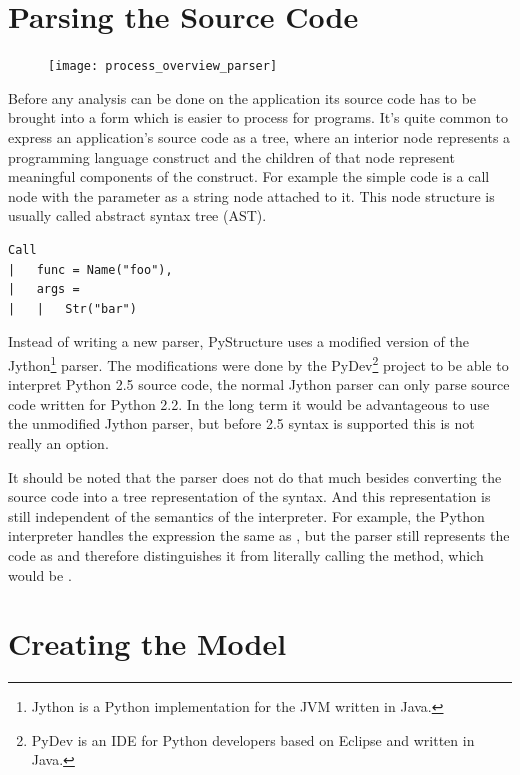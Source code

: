 \documentclass[12pt,halfparskip,DIV11,BCOR10mm]{scrreprt}
\begin{document}
\section{Parsing the Source Code}

\begin{figure}
	\vspace{-0.6cm}
	\texttt{[image: process\_overview\_parser]}
\end{figure}

Before any analysis can be done on the application its source code has to be brought into a form which is easier to process for programs. It's quite common to express an application's source code as a tree, where an interior node represents a programming language construct and the children of that node represent meaningful components of the construct. For example the simple code  is a call node with the parameter as a string node attached to it. This node structure is usually called abstract syntax tree (AST).

\begin{lstlisting}
Call
|   func = Name("foo"),
|   args = 
|   |   Str("bar")
\end{lstlisting}

Instead of writing a new parser, PyStructure uses a modified version of the Jython\footnote{Jython is a Python implementation for the JVM written in Java.} parser. The modifications were done by the PyDev\footnote{PyDev is an IDE for Python developers based on Eclipse and written in Java.} project to be able to interpret Python 2.5 source code, the normal Jython parser can only parse source code written for Python 2.2. In the long term it would be advantageous to use the unmodified Jython parser, but before 2.5 syntax is supported this is not really an option.

It should be noted that the parser does not do that much besides converting the source code into a tree representation of the syntax. And this representation is still independent of the semantics of the interpreter. For example, the Python interpreter handles the expression  the same as , but the parser still represents the code as  and therefore distinguishes it from literally calling the  method, which would be .


\section{Creating the Model}
\label{creating_the_model}
\end{document}
